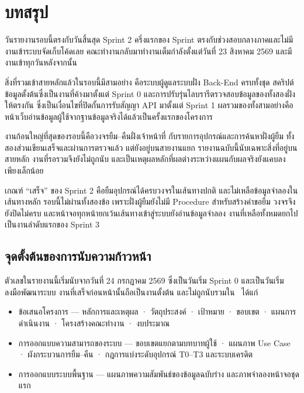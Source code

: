 \section{บทสรุป}

วันรายงานรอบนี้ตรงกับวันสิ้นสุด Sprint 2 ครึ่งแรกของ Sprint ตรงกับช่วงสอบกลางภาคและไม่มีงานเข้าระบบจัดเก็บโค้ดเลย คณะทำงานกลับมาทำงานเต็มกำลังตั้งแต่วันที่ 23 สิงหาคม 2569 และมีงานเข้าทุกวันหลังจากนั้น

สิ่งที่รวมเข้าสายหลักแล้วในรอบนี้มีสามอย่าง คือระบบผู้ดูแลระบบฝั่ง Back-End ครบทั้งชุด สคริปต์ข้อมูลตั้งต้นซึ่งเป็นงานที่ค้างมาตั้งแต่ Sprint 0 และการปรับรุ่นไลบรารีตรวจสอบข้อมูลของทั้งสองฝั่งให้ตรงกัน ซึ่งเป็นเงื่อนไขที่ปิดกั้นการรับสัญญา API มาตั้งแต่ Sprint 1 ผลรวมของทั้งสามอย่างคือหน้าเว็บอ่านข้อมูลผู้ใช้จากฐานข้อมูลจริงได้แล้วเป็นครั้งแรกของโครงการ

งานก้อนใหญ่ที่สุดของรอบนี้คือวงจรยืม–คืนฝั่งเจ้าหน้าที่ กับรายการอุปกรณ์และการค้นหาฝั่งผู้ยืม ทั้งสองส่วนเขียนเสร็จและผ่านการตรวจแล้ว แต่ยังอยู่บนสายงานแยก รายงานฉบับนี้นับเฉพาะสิ่งที่อยู่บนสายหลัก งานที่รอรวมจึงยังไม่ถูกนับ และเป็นเหตุผลหลักที่ผลต่างระหว่างแผนกับผลจริงยังแคบลงเพียงเล็กน้อย

เกณฑ์ ``เสร็จ'' ของ Sprint 2 คือยืมอุปกรณ์ได้ครบวงจรในเส้นทางปกติ และไม่เหลือข้อมูลจำลองในเส้นทางหลัก รอบนี้ไม่ผ่านทั้งสองข้อ เพราะฝั่งผู้ยืมยังไม่มี Procedure สำหรับสร้างคำขอยืม วงจรจึงยังปิดไม่ครบ และหน้าจอทุกหน้ายกเว้นเส้นทางเข้าสู่ระบบยังอ่านข้อมูลจำลอง งานที่เหลือทั้งหมดยกไปเป็นงานลำดับแรกของ Sprint 3

\subsection*{จุดตั้งต้นของการนับความก้าวหน้า}

ตัวเลขในรายงานนี้เริ่มนับจากวันที่ 24 กรกฎาคม 2569 ซึ่งเป็นวันเริ่ม Sprint 0 และเป็นวันเริ่มลงมือพัฒนาระบบ งานที่เสร็จก่อนหน้านั้นถือเป็นงานตั้งต้น และไม่ถูกนับรวมใน \actualpct\ ได้แก่

\begin{itemize}
  \item ข้อเสนอโครงการ — หลักการและเหตุผล · วัตถุประสงค์ · เป้าหมาย · ขอบเขต · แผนการดำเนินงาน · โครงสร้างคณะทำงาน · งบประมาณ
  \item การออกแบบความสามารถของระบบ — ขอบเขตแยกตามบทบาทผู้ใช้ · แผนภาพ Use Case · ผังกระบวนการยืม–คืน · กฎการแบ่งระดับอุปกรณ์ T0–T3 และระบบเครดิต
  \item การออกแบบระบบพื้นฐาน — แผนภาพความสัมพันธ์ของข้อมูลฉบับร่าง และภาพจำลองหน้าจอชุดแรก
\end{itemize}

